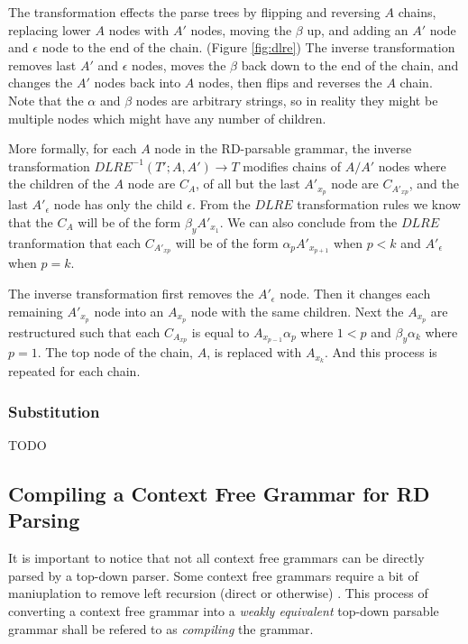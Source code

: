 \documentclass[11pt]{article}
\begin{document}
The transformation effects the parse trees by flipping and reversing $A$ chains,
replacing lower $A$ nodes with $A'$ nodes, moving the $\beta$ up,
and adding an $A'$ node and $\epsilon$ node to the end of the chain. (Figure \ref{fig:dlre}) The inverse transformation
removes last $A'$ and $\epsilon$ nodes, moves the $\beta$ back down to the end of the chain, and changes the $A'$ nodes back into
$A$ nodes, then flips and reverses the $A$ chain. Note that the $\alpha$ and $\beta$ nodes are arbitrary strings, so in reality
they might be multiple nodes which might have any number of children.

More formally, for each $A$ node in the RD-parsable grammar, the inverse transformation $DLRE^{-1}(T'; A, A') \rightarrow T$
modifies chains of $A/A'$ nodes where the children of the $A$ node are $C_A$, of all but the last $A'_{x_p}$ node are $C_{A'_{x p}}$,
and the last $A'_\epsilon$ node has only the child $\epsilon$.
From the $DLRE$ transformation rules we know that the $C_A$ will be of the form $\beta_y A'_{x_1}$. 
We can also conclude from the $DLRE$ tranformation that each $C_{A'_{x p}}$ will be of the form $\alpha_p A'_{x_{p+1}}$
when $p < k$ and $A'_\epsilon$ when $p=k$. 

The inverse transformation first removes the $A'_\epsilon$ node. Then it changes each remaining $A'_{x_p}$ node into an $A_{x_p}$ node
with the same children. Next the $A_{x_p}$ are restructured such that each $C_{A_{x p}}$
is equal to $A_{x_{p-1}} \alpha_p$ where $1 < p$ and $\beta_y \alpha_k$ where $p=1$. The top node of the chain, 
$A$, is replaced with $A_{x_k}$. And this process is repeated for each chain.

\subsubsection{Substitution}

TODO

\clearpage

\subsection{Compiling a Context Free Grammar for RD Parsing}

It is important to notice that not all context free grammars can be directly parsed by a
top-down parser. Some context free grammars require a bit of maniuplation to remove
left recursion (direct or otherwise) \cite{compiler}. This process of converting a context
free grammar into a {\em weakly equivalent} top-down parsable grammar shall be refered to as
{\em compiling} the grammar.
\end{document}
